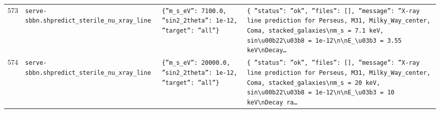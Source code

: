 \documentclass[11pt,a4paper]{article}
\begin{document}
\begin{longtable}{@{}p{}p{}p{}p{}@{}}
573 & \texttt{serve-sbbn.sh}\newline\texttt{predict\_\allowbreak{}sterile\_\allowbreak{}nu\_\allowbreak{}xray\_\allowbreak{}line} & \texttt{\{''m\_\allowbreak{}s\_\allowbreak{}eV'':\allowbreak{} 7100.0,\allowbreak{} ''sin2\_\allowbreak{}2theta'':\allowbreak{} 1e-12,\allowbreak{} ''target'':\allowbreak{} ''all''\}\allowbreak{}} & \texttt{\{   ''status'':\allowbreak{} ''ok'',\allowbreak{}   ''files'':\allowbreak{} []\allowbreak{},\allowbreak{}   ''message'':\allowbreak{} ''X-ray line prediction for Perseus,\allowbreak{} M31,\allowbreak{} Milky\_\allowbreak{}Way\_\allowbreak{}center,\allowbreak{} Coma,\allowbreak{} stacked\_\allowbreak{}galaxies\textbackslash{}\allowbreak{}nm\_\allowbreak{}s =\allowbreak{} 7.1 keV,\allowbreak{} sin\textbackslash{}\allowbreak{}u00b22\textbackslash{}\allowbreak{}u03b8 =\allowbreak{} 1e-12\textbackslash{}\allowbreak{}n\textbackslash{}\allowbreak{}nE\_\allowbreak{}\textbackslash{}\allowbreak{}u03b3 =\allowbreak{} 3.55 keV\textbackslash{}\allowbreak{}nDecay\ldots{}\allowbreak{}} \\
574 & \texttt{serve-sbbn.sh}\newline\texttt{predict\_\allowbreak{}sterile\_\allowbreak{}nu\_\allowbreak{}xray\_\allowbreak{}line} & \texttt{\{''m\_\allowbreak{}s\_\allowbreak{}eV'':\allowbreak{} 20000.0,\allowbreak{} ''sin2\_\allowbreak{}2theta'':\allowbreak{} 1e-12,\allowbreak{} ''target'':\allowbreak{} ''all''\}\allowbreak{}} & \texttt{\{   ''status'':\allowbreak{} ''ok'',\allowbreak{}   ''files'':\allowbreak{} []\allowbreak{},\allowbreak{}   ''message'':\allowbreak{} ''X-ray line prediction for Perseus,\allowbreak{} M31,\allowbreak{} Milky\_\allowbreak{}Way\_\allowbreak{}center,\allowbreak{} Coma,\allowbreak{} stacked\_\allowbreak{}galaxies\textbackslash{}\allowbreak{}nm\_\allowbreak{}s =\allowbreak{} 20 keV,\allowbreak{} sin\textbackslash{}\allowbreak{}u00b22\textbackslash{}\allowbreak{}u03b8 =\allowbreak{} 1e-12\textbackslash{}\allowbreak{}n\textbackslash{}\allowbreak{}nE\_\allowbreak{}\textbackslash{}\allowbreak{}u03b3 =\allowbreak{} 10 keV\textbackslash{}\allowbreak{}nDecay ra\ldots{}\allowbreak{}} \\

\end{longtable}
\end{document}
